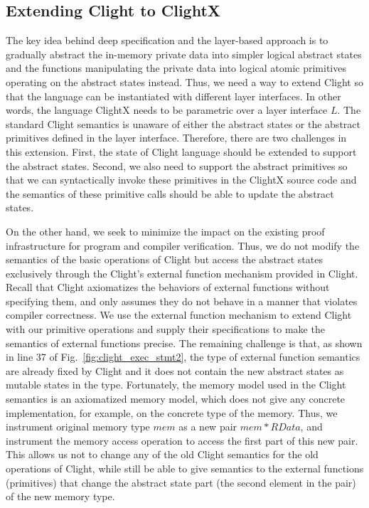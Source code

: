 \subsection{Extending Clight to ClightX}

The key idea behind deep specification and the layer-based approach
is to gradually abstract the in-memory private data into simpler logical
abstract states and the functions manipulating the private data
into logical atomic primitives operating on the abstract states instead.
Thus, we need a way to extend Clight so that the language can be instantiated
with different layer interfaces. In other words, the language ClightX
needs to be parametric over a layer interface $L$. 
The standard Clight semantics is unaware of either the
abstract states or the abstract primitives defined in the layer
interface. Therefore, there are two challenges
in this extension. First, the state of Clight language should be extended
to support the abstract states. Second, we also need to support
the abstract primitives so that we can syntactically invoke these primitives
in the ClightX source code and the semantics of these primitive calls
should be able to update the abstract states.

On the other hand, we seek to minimize the impact on the existing proof
infrastructure for program and compiler verification. Thus, we do not
modify the semantics of the basic operations of Clight but access the
abstract states exclusively through the Clight's external function
mechanism provided in Clight. Recall that
Clight axiomatizes the behaviors of external functions without
specifying them, and only assumes they do not behave in a manner that
violates compiler correctness. We use the external function mechanism
to extend Clight with our primitive operations and supply their
specifications to make the semantics of external functions precise. 
The remaining challenge is that, as shown in line 37 of
Fig.~\ref{fig:clight_exec_stmt2}, the type of external function semantics
are already fixed by Clight and it does not contain the new abstract states
as mutable states in the type. Fortunately, the memory model used in
the Clight semantics is an axiomatized memory model, which does not
give any concrete implementation, for example, on the concrete type
of the memory. Thus, we instrument original memory type $mem$ as a
new pair $mem * RData$, and instrument the memory access operation
to access the first part of this new pair. This allows us not to change
any of the old Clight semantics for the old operations of Clight,
while still be able to give semantics to the external functions (primitives)
that change the abstract state part (the second element in the pair)
of the new memory type.


